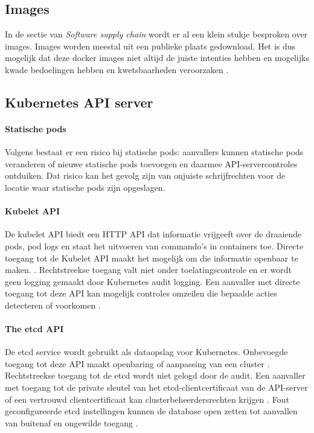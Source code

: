 \subsection{Images}
In de sectie van \textit{Software supply chain} wordt er al een klein stukje besproken over images. Images worden meestal uit een publieke plaats gedownload. Het is dus mogelijk dat deze docker images niet altijd de juiste intenties hebben en mogelijks kwade bedoelingen hebben en kwetsbaarheden veroorzaken \autocite{mytilinakis2020attack}. 

\subsection{Kubernetes API server}
\paragraph{Statische pods}
Volgens \textcite{KubernetesDocs-2023} bestaat er een risico bij statische pods: aanvallers kunnen statische pods veranderen of nieuwe statische pods toevoegen en daarmee API-servercontroles ontduiken. Dat risico kan het gevolg zijn van onjuiste schrijfrechten voor de locatie waar statische pods zijn opgeslagen.

\paragraph{Kubelet API}
De kubelet API biedt een HTTP API dat informatie vrijgeeft over de draaiende pods, pod logs en staat het uitvoeren van commando's in containers toe.
Directe toegang tot de Kubelet API maakt het mogelijk om die informatie openbaar te maken. \autocite{KubernetesDocs-2023}.
Rechtstreekse toegang valt niet onder toelatingscontrole en er wordt geen logging gemaakt door Kubernetes audit logging. Een aanvaller met directe toegang tot deze API kan mogelijk controles omzeilen die bepaalde acties detecteren of voorkomen \autocite{KubernetesDocs-2023}.

\paragraph{The etcd API}
De etcd service wordt gebruikt als dataopslag voor Kubernetes. Onbevoegde toegang tot deze API maakt openbaring of aanpassing van een cluster \autocite{KubernetesDocs-2023}. Rechtstreekse toegang tot de etcd wordt niet gelogd door de audit.
Een aanvaller met toegang tot de private sleutel van het etcd-clientcertificaat van de API-server of een vertrouwd clientcertificaat kan clusterbeheerdersrechten krijgen \autocite{KubernetesDocs-2023}. Fout geconfigureerde etcd instellingen kunnen de database open zetten tot aanvallen van buitenaf en ongewilde toegang \autocite{KubernetesDocs-2023}.

